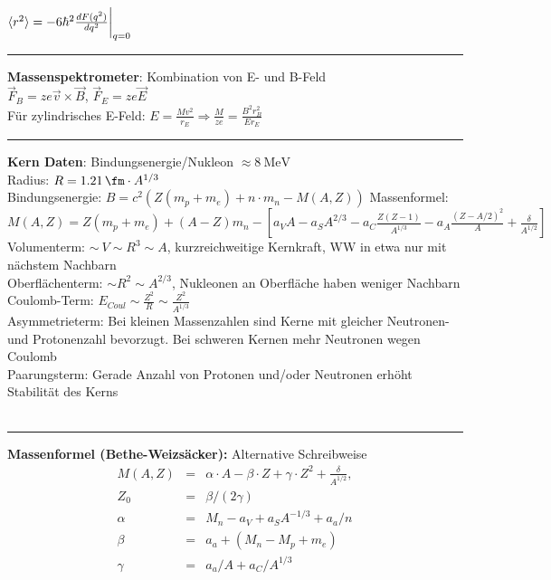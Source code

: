 \documentclass[10pt,twoside,a4paper]{article}
\begin{document}
\begin{multicols*}{3}
$\braket{r^2} = -6\hbar^2 \frac{dF(q^2)}{dq^2}\bigg|_{q=0}$
\\ \rule[0ex]{\columnwidth}{0.5pt}
\textbf{Massenspektrometer}: Kombination von E- und B-Feld \\
$\vec{F}_B = z e \vec{v} \times \vec{B}$, $\vec{F}_E = z e \vec{E}$ \\
Für zylindrisches E-Feld: $E = \frac{Mv^2}{r_E} \Rightarrow \frac{M}{z e} = \frac{B^2 r^2_B}{E r_E}$
\\ \rule[0ex]{\columnwidth}{0.5pt}
\textbf{Kern Daten}: Bindungsenergie/Nukleon $\approx \SI{8}{\mega\eV}$ \\
Radius: $R = \SI{1.21}{\fm} \cdot A^{1/3}$ \\
Bindungsenergie: $B = c^2 \left( Z (m_p + m_e) + n \cdot m_n - M(A, Z) \right)$
Massenformel: $M\left( A, Z \right) = Z \left( m_p + m_e \right) + \left( A - Z \right) m_n - \left[ a_V A - a_S A^{2/3} - a_C \frac{Z(Z-1)}{A^{1/3}} - a_A \frac{(Z - A/2)^2}{A} + \frac{\delta}{A^{1/2}} \right]$ \\
Volumenterm: $\sim\ V \sim R^3 \sim A$, kurzreichweitige Kernkraft, WW in etwa nur mit nächstem Nachbarn \\
Oberflächenterm: $\sim R^2 \sim A^{2/3}$, Nukleonen an Oberfläche haben weniger Nachbarn \\
Coulomb-Term: $E_{Coul} \sim \frac{Z^2}{R} \sim \frac{Z^2}{A^{1/3}}$ \\
Asymmetrieterm: Bei kleinen Massenzahlen sind Kerne mit gleicher Neutronen- und Protonenzahl bevorzugt. Bei schweren Kernen mehr Neutronen wegen Coulomb \\
Paarungsterm: Gerade Anzahl von Protonen und/oder Neutronen erhöht Stabilität des Kerns \\
\\ \rule[0ex]{\columnwidth}{0.5pt}
\textbf{Massenformel (Bethe-Weizsäcker):} 
Alternative Schreibweise\vspace{-9pt}
\begin{eqnarray*}
M(A,Z) &=& \alpha\cdot A - \beta \cdot Z + \gamma \cdot Z^2+\frac{\delta}{A^{1/2}},\\[-7pt]
 Z_0 &=& \beta/(2\gamma)\\[-7pt]
\alpha &=& M_n - a_V + a_SA^{-1/3} + a_a/n\\[-4pt]
\beta &=& a_a + (M_n - M_p + m_e)\\[-4pt]
\gamma &=& a_a/A + a_C/A^{1/3}\\[-4pt]

\end{eqnarray*}
\end{multicols*}
\end{document}
